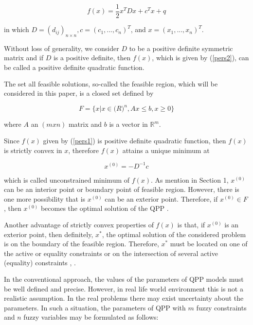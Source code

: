 \documentclass{iaesarticle3}
\begin{document}
\begin{equation}\label{pers2}
    f(x) = \frac{1}{2} x^TDx + c^Tx + q
\end{equation}

\noindent in which $D = (d_{ij})_{n \times n}, c = (c_1,..., c_n)^T$, and $x = (x_1,..., x_n)^T$.

Without loss of generality, we consider $D$ to be a positive definite symmetric matrix and if $D$ is a positive definite, then $f(x)$, which is given by (\ref{pers2}), can be called a positive definite quadratic function.

The set all feasible solutions, so-called the feasible region, which will be considered in this paper, is a closed set defined by

\begin{equation}\label{pers3}
    F = \{x|x \in \mathbb(R)^n, Ax \leq b, x \geq 0 \}
\end{equation}

\noindent where $A$ an $(mxn)$ matrix and $b$ is a vector in $\mathbb{R}^m$.

Since $f(x)$ given by (\ref{pers1}) is positive definite quadratic function, then $f(x)$ is strictly convex in $x$, therefore $f(x)$ attains a unique minimum at

\begin{equation}\label{pers4}
    x^{(0)} = -D^{-1}c
\end{equation}

\noindent which is called unconstrained minimum of $f(x)$. As mention in Section 1, $x^{(0)}$ can be an interior point or boundary point of feasible region. However, there is one more possibility that is $x^{(0)}$ can be an exterior point. Therefore, if $x^{(0)} \in F$, then $x^{(0)}$ becomes the optimal solution of the QPP \cite{iby}.

Another advantage of strictly convex properties of $f(x)$ is that, if $x^{(0)}$ is an exterior point, then definitely, $x^*$, the optimal solution of the considered problem is on the boundary of the feasible region. Therefore, $x^*$ must be located on one of the active or equality constraints or on the intersection of several active (equality) constraints \cite{ism}, \cite{isy}.

In the conventional approach, the values of the parameters of QPP models must be well defined and precise. However, in real life world environment this is not a realistic assumption. In the real problems there may exist uncertainty about the parameters. In such a situation, the parameters of QPP with $m$ fuzzy constraints and $n$ fuzzy variables may be formulated as follows:
\end{document}
